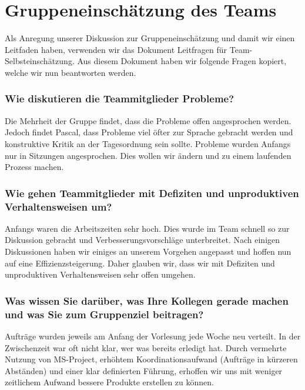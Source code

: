 \chapter{Gruppeneinschätzung des Teams}\label{Gruppenteameinschätzung}

Als Anregung unserer Diskussion zur Gruppeneinschätzung und damit wir einen Leitfaden haben, verwenden wir das Dokument Leitfragen für Team-Selbsteinschätzung. Aus diesem Dokument haben wir folgende Fragen kopiert, welche wir nun beantworten werden.
  
\subsection*{Wie diskutieren die Teammitglieder Probleme?}

Die Mehrheit der Gruppe findet, dass die Probleme offen angesprochen werden. Jedoch findet Pascal, dass Probleme viel öfter zur Sprache gebracht werden und konstruktive Kritik an der Tagesordnung sein sollte. 
Probleme wurden Anfangs nur in Sitzungen angesprochen. Dies wollen wir ändern und zu einem laufenden Prozess machen. 

\subsection*{Wie gehen Teammitglieder mit Defiziten und unproduktiven Verhaltensweisen um?}

Anfangs waren die Arbeitszeiten sehr hoch. Dies wurde im Team schnell so zur Diskussion gebracht und Verbesserungsvorschläge unterbreitet. Nach einigen Diskussionen haben wir einiges an unserem Vorgehen angepasst und hoffen nun auf eine Effizienzsteigerung. Daher glauben wir, dass wir mit Defiziten und unproduktiven Verhaltensweisen sehr offen umgehen.

\subsection*{Was wissen Sie darüber, was Ihre Kollegen gerade machen und was Sie zum
Gruppenziel beitragen?}

Aufträge wurden jeweils am Anfang der Vorlesung jede Woche neu verteilt. In der Zwischenzeit war oft nicht klar, wer was bereits erledigt hat. Durch vermehrte Nutzung von MS-Project, erhöhtem Koordinationsaufwand (Aufträge in kürzeren Abständen) und einer klar definierten Führung, erhoffen wir uns mit weniger zeitlichem Aufwand bessere Produkte erstellen zu können.

